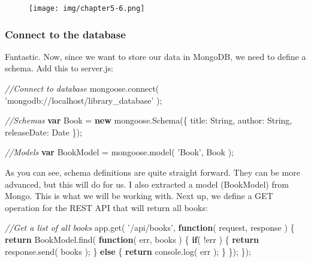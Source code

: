 \documentclass[9pt]{book}
\newenvironment{Shaded}{}{}
\newcommand{\KeywordTok}[1]{\textcolor[rgb]{0.00,0.44,0.13}{\textbf{{#1}}}}
\newcommand{\DataTypeTok}[1]{\textcolor[rgb]{0.56,0.13,0.00}{{#1}}}
\newcommand{\StringTok}[1]{\textcolor[rgb]{0.25,0.44,0.63}{{#1}}}
\newcommand{\CommentTok}[1]{\textcolor[rgb]{0.38,0.63,0.69}{\textit{{#1}}}}
\newcommand{\OtherTok}[1]{\textcolor[rgb]{0.00,0.44,0.13}{{#1}}}
\newcommand{\FunctionTok}[1]{\textcolor[rgb]{0.02,0.16,0.49}{{#1}}}
\newcommand{\NormalTok}[1]{{#1}}
\begin{document}
\begin{figure}[htbp]
\centering
\texttt{[image: img/chapter5-6.png]}
\end{figure}

\subsubsection{Connect to the database}\label{connect-to-the-database}

Fantastic. Now, since we want to store our data in MongoDB, we need to
define a schema. Add this to server.js:

\begin{Shaded}
\begin{Highlighting}[]
\CommentTok{//Connect to database}
\OtherTok{mongoose}\NormalTok{.}\FunctionTok{connect}\NormalTok{( }\StringTok{'mongodb://localhost/library_database'} \NormalTok{);}

\CommentTok{//Schemas}
\KeywordTok{var} \NormalTok{Book = }\KeywordTok{new} \OtherTok{mongoose}\NormalTok{.}\FunctionTok{Schema}\NormalTok{(\{}
    \DataTypeTok{title}\NormalTok{: String,}
    \DataTypeTok{author}\NormalTok{: String,}
    \DataTypeTok{releaseDate}\NormalTok{: Date}
\NormalTok{\});}

\CommentTok{//Models}
\KeywordTok{var} \NormalTok{BookModel = }\OtherTok{mongoose}\NormalTok{.}\FunctionTok{model}\NormalTok{( }\StringTok{'Book'}\NormalTok{, Book );}
\end{Highlighting}
\end{Shaded}

As you can see, schema definitions are quite straight forward. They can
be more advanced, but this will do for us. I also extracted a model
(BookModel) from Mongo. This is what we will be working with. Next up,
we define a GET operation for the REST API that will return all books:

\begin{Shaded}
\begin{Highlighting}[]
\CommentTok{//Get a list of all books}
\OtherTok{app}\NormalTok{.}\FunctionTok{get}\NormalTok{( }\StringTok{'/api/books'}\NormalTok{, }\KeywordTok{function}\NormalTok{( request, response ) \{}
    \KeywordTok{return} \OtherTok{BookModel}\NormalTok{.}\FunctionTok{find}\NormalTok{( }\KeywordTok{function}\NormalTok{( err, books ) \{}
        \KeywordTok{if}\NormalTok{( !err ) \{}
            \KeywordTok{return} \OtherTok{response}\NormalTok{.}\FunctionTok{send}\NormalTok{( books );}
        \NormalTok{\} }\KeywordTok{else} \NormalTok{\{}
            \KeywordTok{return} \OtherTok{console}\NormalTok{.}\FunctionTok{log}\NormalTok{( err );}
        \NormalTok{\}}
    \NormalTok{\});}
\NormalTok{\});}
\end{Highlighting}
\end{Shaded}
\end{document}
